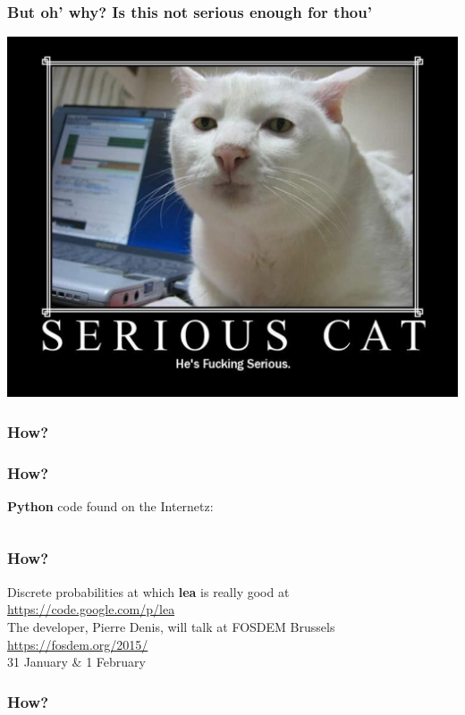 \documentclass[a4paper]{beamer}
\begin{document}
\begin{frame}
\frametitle{But oh' why? Is this not serious enough for thou'} 
\includegraphics[scale=0.21]{img/serious-cat.jpg}
\end{frame}

\begin{frame}
\frametitle{How?} 

\end{frame}

\begin{frame}
\frametitle{How?} 

{\bf Python} code found on the Internetz:

\inputminted[firstline=1, lastline=15, gobble=0, linenos, mathescape, bgcolor=bg, numbersep=8pt, frame=lines, framesep=3mm, fontsize=\scriptsize]{python}{/Users/steve/GoogleDrive/py-club/bullshit_generator.py}
\end{frame}

\begin{frame}
\frametitle{How?} 
Discrete probabilities
at which {\bf lea} is really good at
\url{https://code.google.com/p/lea}
\\

The developer, Pierre Denis, will talk at FOSDEM Brussels
\\

\url{https://fosdem.org/2015/}
\\

31 January \& 1 February
\end{frame}


\begin{frame}
\frametitle{How?} 

\inputminted[firstline=13, lastline=15, gobble=0, linenos, mathescape, bgcolor=bg, numbersep=8pt, frame=lines, framesep=3mm, fontsize=\scriptsize]{python}{/Users/steve/GoogleDrive/py-club/bullshit_generator.py}

\inputminted[firstline=71, lastline=79, gobble=0, linenos, mathescape, bgcolor=bg, numbersep=8pt, frame=lines, framesep=3mm, fontsize=\scriptsize]{python}{/Users/steve/GoogleDrive/py-club/bullshit_generator.py}

\end{frame}
\end{document}
